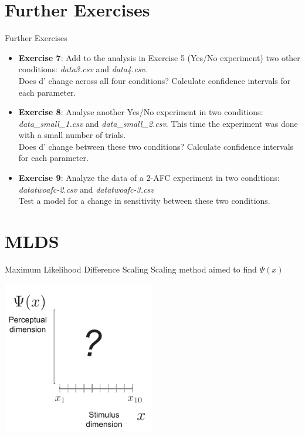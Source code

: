 \documentclass[10pt]{beamer}
\begin{document}
\section{Further Exercises}
\begin{frame}{Further Exercises}

\begin{itemize}

\item \textbf{Exercise 7}: Add to the analysis in Exercise 5 (Yes/No experiment) two other conditions: \textit{data3.csv} and \textit{data4.csv}. \\
Does d' change across all four conditions?  Calculate confidence intervals for each parameter.

\vspace{20pt}
\item \textbf{Exercise 8}: Analyse another Yes/No experiment in two conditions: \textit{data\_small\_1.csv} and \textit{data\_small\_2.csv}. This time the experiment was done with a small number of trials.\\
Does d' change between these two conditions? Calculate confidence intervals for each parameter.


\vspace{20pt}
\item \textbf{Exercise 9}: Analyze the data of a 2-AFC experiment in two conditions: \textit{datatwoafc-2.csv} and \textit{datatwoafc-3.csv}\\
Test a model for a change in sensitivity between these two conditions.


\end{itemize}

\end{frame}



\section{MLDS}
\begin{frame}{Maximum Likelihood Difference Scaling}
Scaling method aimed to find $\Psi(x)$
\begin{center}
\includegraphics[width=0.5\textwidth]{figs/scaling_stimspacing.pdf}
\end{center}
\end{frame}
\end{document}

